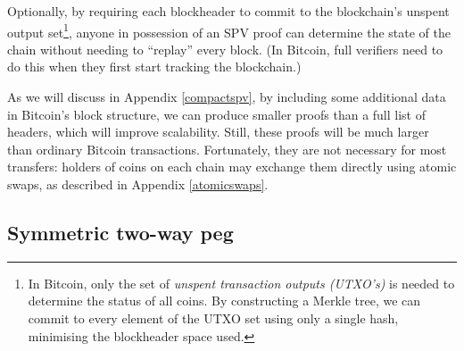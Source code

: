 \documentclass[letterpaper]{article}
\begin{document}
\begin{itemize}
Optionally, by requiring each blockheader to commit
to the blockchain's unspent output set\footnote{In Bitcoin, only the set
of \emph{unspent transaction
outputs (UTXO's)} is needed to determine the status of all coins. By constructing a
Merkle tree\cite{merkle1988}, we can commit to every element of the UTXO set using only
a single hash, minimising the blockheader space used.}, anyone in possession of an SPV
proof can determine the
state of the chain without needing to ``replay'' every block. (In Bitcoin, full
verifiers need to do this when they first start tracking the blockchain.)

As we will discuss in Appendix \ref{compactspv}, by including some additional
data in Bitcoin's block structure, we can produce smaller
proofs than a full list of headers, which will improve scalability.
Still, these proofs will be much larger than ordinary Bitcoin transactions. Fortunately,
they are not necessary for most transfers: holders of coins on each chain may exchange
them directly using atomic swaps\cite{nolan2013}, as described in Appendix \ref{atomicswaps}.
\end{itemize}

\subsection{Symmetric two-way peg\label{symmpeg}}
\end{document}

